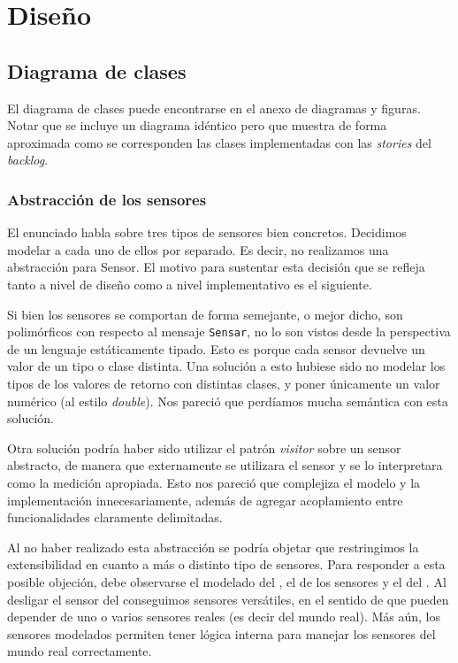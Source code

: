 \section{Dise\~no}

  \subsection{Diagrama de clases}
    El diagrama de clases puede encontrarse en el anexo de diagramas y figuras.
    Notar que se incluye un diagrama id\'entico pero que muestra de forma aproximada
    como se corresponden las clases implementadas con las \textit{stories} del
    \textit{backlog}.

      \subsubsection{Abstracci\'on de los sensores}
          El enunciado habla sobre tres tipos de sensores bien concretos.
          Decidimos modelar a cada uno de ellos por separado. Es decir, no realizamos
          una abstracci\'on para Sensor. El motivo para sustentar esta decisi\'on
          que se refleja tanto a nivel de dise\~no como a nivel implementativo es
          el siguiente.

          Si bien los sensores se comportan de forma semejante,
          o mejor dicho, son polim\'orficos con respecto al mensaje \texttt{Sensar},
          no lo son vistos desde la perspectiva de un lenguaje est\'aticamente tipado.
          Esto es porque cada sensor devuelve un valor de un tipo o clase distinta.
          Una soluci\'on a esto hubiese sido no modelar los tipos de los valores de
          retorno con distintas clases, y poner \'unicamente un valor num\'erico
          (al estilo \textit{double}). Nos
          pareci\'o que perd\'iamos mucha sem\'antica con esta soluci\'on.

          Otra soluci\'on podr\'ia haber sido utilizar el patr\'on \textit{visitor} sobre
          un sensor abstracto, de manera que externamente se utilizara el sensor y se lo
          interpretara como la medici\'on apropiada. Esto nos pareci\'o que complejiza el
          modelo y la implementaci\'on innecesariamente, adem\'as de agregar acoplamiento
          entre funcionalidades claramente delimitadas.

          Al no haber realizado esta abstracci\'on se podr\'ia objetar que restringimos
          la extensibilidad en cuanto a m\'as o distinto tipo de sensores.
          Para responder a esta posible objeci\'on, debe observarse el modelado del
          \condiciones{}, el de los sensores y el del \arduino{}.
          Al desligar el sensor del \arduino{} conseguimos
          sensores vers\'atiles, en el sentido de que pueden depender de uno o varios sensores
          reales (es decir del mundo real). M\'as a\'un, los sensores modelados
          permiten tener l\'ogica interna para manejar los sensores del mundo real
          correctamente.


